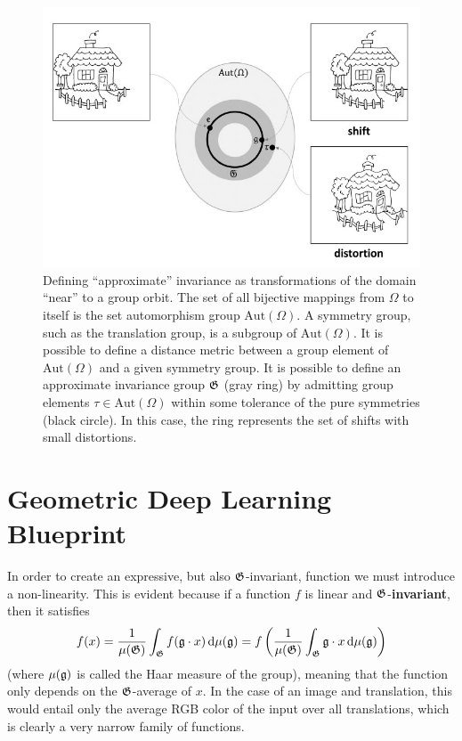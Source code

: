 \documentclass[11pt]{article}
\numberwithin{equation}{section}
\renewcommand{\d}[1]{\ensuremath{\operatorname{d}\!{#1}}}
\begin{document}
\begin{figure}
\begin{center}
\includegraphics[width=0.7\columnwidth]{../figures/automorphism-group.jpg}  
\end{center}
\caption{Defining ``approximate'' invariance as transformations of the domain ``near'' to a group orbit. The set of all bijective mappings from $\Omega$ to itself is the set automorphism group $\mathrm{Aut}(\Omega)$. A symmetry group, such as the translation group, is a subgroup of $\mathrm{Aut}(\Omega)$. It is possible to define a distance metric between a group element of $\mathrm{Aut}(\Omega)$ and a given symmetry group. It is possible to define an approximate invariance group $\mathfrak{G}$ (gray ring) by admitting group elements $\tau \in \mathrm{Aut}(\Omega)$ within some tolerance of the pure symmetries (black circle). In this case, the ring represents the set of shifts with small distortions.
}
\label{fig:approx-invar}
\end{figure}

\section{Geometric Deep Learning Blueprint}

In order to create an expressive, but also $\mathfrak{G}$-invariant, function we must introduce a non-linearity. This is evident because if a function $f$ is linear and $\mathfrak{G}$-\textbf{invariant}, then it satisfies
\begin{equation}
f(x) = \frac{1}{\mu(\f{G})} \int_{\f{G}} f(\f{g}\cdot x) \d \mu(\f{g}) =  f\left( \frac{1}{\mu(\f{G})} \int_{\f{G}} \f{g}\cdot x \d \mu(\f{g})\right)
\end{equation}
(where $\mu(\mathfrak{g})$ is called the Haar measure of the group), meaning that the function only depends on the $\mathfrak{G}$-average of $x$. In the case of an image and translation, this would entail only the average RGB color of the input over all translations, which is clearly a very narrow family of functions.
\end{document}
